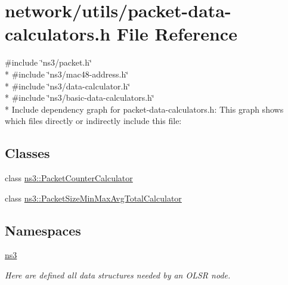 \hypertarget{packet-data-calculators_8h}{}\section{network/utils/packet-\/data-\/calculators.h File Reference}
\label{packet-data-calculators_8h}
{\ttfamily \#include \char`\"{}ns3/packet.\+h\char`\"{}}\\*
{\ttfamily \#include \char`\"{}ns3/mac48-\/address.\+h\char`\"{}}\\*
{\ttfamily \#include \char`\"{}ns3/data-\/calculator.\+h\char`\"{}}\\*
{\ttfamily \#include \char`\"{}ns3/basic-\/data-\/calculators.\+h\char`\"{}}\\*
Include dependency graph for packet-\/data-\/calculators.h\+:
This graph shows which files directly or indirectly include this file\+:
\subsection*{Classes}
\begin{DoxyCompactItemize}
\item 
class \hyperlink{classns3_1_1PacketCounterCalculator}{ns3\+::\+Packet\+Counter\+Calculator}
\item 
class \hyperlink{classns3_1_1PacketSizeMinMaxAvgTotalCalculator}{ns3\+::\+Packet\+Size\+Min\+Max\+Avg\+Total\+Calculator}
\end{DoxyCompactItemize}
\subsection*{Namespaces}
\begin{DoxyCompactItemize}
\item 
 \hyperlink{namespacens3}{ns3}
\begin{DoxyCompactList}\small\item\em Here are defined all data structures needed by an O\+L\+SR node. \end{DoxyCompactList}\end{DoxyCompactItemize}
